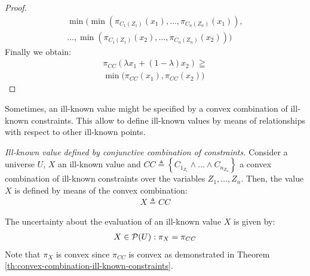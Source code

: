 \begin{proof}
\begin{align}
\nonumber
\min \big( \min \left(\pi_{C_1(Z_1)} \left( x_1 \right), \ldots, \pi_{C_n(Z_n)} \left( x_1 \right) \right),\\
\nonumber
\ldots, \min \left(\pi_{C_1(Z_1)} \left( x_2 \right), \ldots, \pi_{C_n(Z_n)} \left( x_2 \right) \right) \big)
\end{align}
Finally we obtain:
\begin{align}
\label{eq:proof-convex5}
\pi_{CC} \left( \lambda x_1 + \left( 1 - \lambda \right)x_2 \right) \geqq  \\
\nonumber
\min \big(\pi_{CC} \left( x_1 \right), \pi_{CC} \left( x_2 \right) \big)
\end{align}
\end{proof}

Sometimes, an ill-known value might be specified by a convex combination of ill-known constraints. This allow to define ill-known values by means of relationships with respect to other ill-known points.


\begin{definition}
\label{def:convex-combination-ill-known-constraints}
\emph{Ill-known value defined by conjunctive combination of constraints.}
Consider a universe $U$, $X$ an ill-known value and $CC \triangleq \left \lbrace C_{1_{Z_1}} \wedge \ldots \wedge C_{n_{Z_n}}  \right \rbrace$ a convex combination of ill-known constraints over the variables $Z_1, \ldots, Z_n$. Then, the value $X$ is defined by means of the convex combination:
\begin{align}
\label{eq:ill-known-value-by-convex-constraints}
X \triangleq CC 
\end{align}

The uncertainty about the evaluation of an ill-known value $X$ is given by:
\begin{align}
\label{eq:ill-known-value-def-by-const-unc}
X \in \mathcal{P}(U):\pi_{X}=\pi_{CC}
\end{align} 
Note that $\pi_{X}$ is convex since $\pi_{CC}$ is convex as demonstrated in Theorem \ref{th:convex-combination-ill-known-constraints}.
\end{definition}


